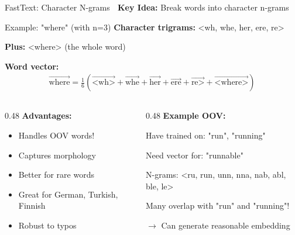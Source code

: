 \documentclass[aspectratio=169]{beamer}
\begin{document}
\begin{frame}{FastText: Character N-grams 🧩}
\textbf{Key Idea:} Break words into character n-grams

\vspace{1em}

\begin{exampleblock}{Example: "where" (with n=3)}
\textbf{Character trigrams:} <wh, whe, her, ere, re>

\textbf{Plus:} <where> (the whole word)

\textbf{Word vector:}
\begin{align*}
\vec{\text{where}} = \frac{1}{6}\left(\vec{\text{<wh>}} + \vec{\text{whe}} + \vec{\text{her}} + \vec{\text{ere}} + \vec{\text{re>}} + \vec{\text{<where>}}\right)
\end{align*}
\end{exampleblock}

\vspace{1em}

\begin{columns}[T]
\begin{column}{0.48\textwidth}
\textbf{Advantages:}
\begin{itemize}\setlength{\itemsep}{0pt}
    \item Handles OOV words!
    \item Captures morphology
    \item Better for rare words
    \item Great for German, Turkish, Finnish
    \item Robust to typos
\end{itemize}
\end{column}

\begin{column}{0.48\textwidth}
\textbf{Example OOV:}

Have trained on: "run", "running"

Need vector for: "runnable"

N-grams: <ru, run, unn, nna, nab, abl, ble, le>

Many overlap with "run" and "running"!

$\rightarrow$ Can generate reasonable embedding
\end{column}
\end{columns}
\end{frame}
\end{document}
